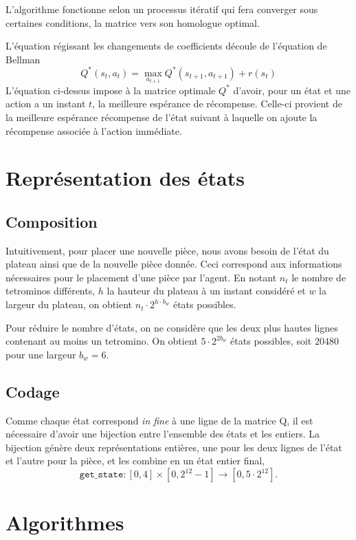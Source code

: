\documentclass{report}
\begin{document}
L'algorithme fonctionne selon un processus itératif qui fera converger sous
certaines conditions, la matrice vers son homologue optimal.

L'équation régissant les changements de coefficients découle de l'équation de
Bellman\cite{mengin}
\[
  Q^*(s_t, a_t) = \max_{a_{t+1}}Q^*(s_{t+1}, a_{t+1}) + r(s_t)
\]
L'équation ci-dessus impose à la matrice optimale \(Q^*\) d'avoir, pour un état
et une action a un instant \(t\), la meilleure espérance de récompense.
Celle-ci provient de la meilleure espérance récompense de l'état suivant à
laquelle on ajoute la récompense associée à l'action immédiate.

\section{Représentation des états}

\subsection{Composition}
Intuitivement, pour placer une nouvelle pièce, nous avons besoin de l'état du
plateau ainsi que de la nouvelle pièce donnée. Ceci correspond aux informations
nécessaires pour le placement d'une pièce par l'agent. En notant \(n_t\) le nombre de tetrominos
différents, \( h \) la hauteur du plateau à un instant considéré  et \(w\) la
largeur du plateau, on obtient \(n_t \cdot 2^{h \cdot b_w}\) états possibles.

Pour réduire le nombre d'états, on ne considère que les deux plus hautes lignes
contenant au moins un tetromino. On obtient \(5\cdot 2^{2 b_w}\) états
possibles, soit \(20480\) pour une largeur \( b_w = 6 \).

\subsection{Codage}
Comme chaque état correspond \textit{in fine} à une ligne de la matrice Q, il est
nécessaire d'avoir une bijection entre l'ensemble des états et les entiers. La
bijection génère deux représentations entières, une pour les deux lignes de
l'état et l'autre pour la pièce, et les combine en un état entier final,
\[
  \texttt{get\_state}\colon [0,4]\times [0, 2^{12} - 1] \to [0, 5\cdot 2^{12}].
\]


\section{Algorithmes}\label{sec:algorithmes}
\end{document}
